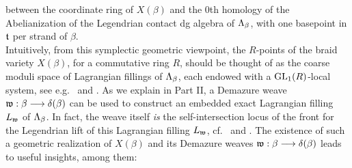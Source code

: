 \noindent between the coordinate ring of $X(\beta)$ and the $0$th homology of the Abelianization of the Legendrian contact dg algebra of $\La_\beta$, with one basepoint in $\tt$ per strand of $\beta$.\\

\noindent Intuitively, from this symplectic geometric viewpoint, the $R$-points of the braid variety $X(\beta)$, for a commutative ring $R$, should be thought of as the coarse moduli space of Lagrangian fillings of $\La_\beta$, each endowed with a $\GL_1(R)$-local system, see e.g.~\cite{MR4575870,EtnyreNg22_Survey,EHK} and . As we explain in Part II, a Demazure weave $\wb$ can be used to construct an embedded exact Lagrangian filling $L_\w$ of $\La_\beta$. In fact, the weave itself {\it is} the self-intersection locus of the front for the Legendrian lift of this Lagrangian filling $L_\w$, cf.~ and . The existence of such a geometric realization of $X(\beta)$ and its Demazure weaves $\wb$ leads to useful insights, among them:

